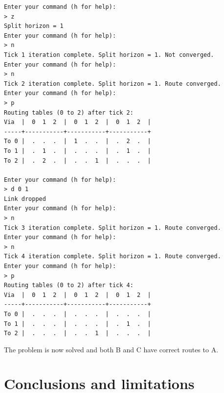 \documentclass[english,11pt]{article}
\newcommand{\ok}{\fontsize{9}{11}\selectfont}
\begin{document}
{\ok
\begin{verbatim}
Enter your command (h for help):                              
> z                                                           
Split horizon = 1                                             
Enter your command (h for help):                              
> n                                                           
Tick 1 iteration complete. Split horizon = 1. Not converged.  
Enter your command (h for help):                              
> n                                                           
Tick 2 iteration complete. Split horizon = 1. Route converged.
Enter your command (h for help):                              
> p                                                           
Routing tables (0 to 2) after tick 2:                         
Via  |  0  1  2  |  0  1  2  |  0  1  2  |                    
-----+-----------+-----------+-----------+                    
To 0 |  .  .  .  |  1  .  .  |  .  2  .  |                    
To 1 |  .  1  .  |  .  .  .  |  .  1  .  |                    
To 2 |  .  2  .  |  .  .  1  |  .  .  .  |                    
                                                              
Enter your command (h for help):                              
> d 0 1                                                       
Link dropped                                                  
Enter your command (h for help):                              
> n                                                           
Tick 3 iteration complete. Split horizon = 1. Route converged.
Enter your command (h for help):                              
> n                                                           
Tick 4 iteration complete. Split horizon = 1. Route converged.
Enter your command (h for help):                              
> p                                                           
Routing tables (0 to 2) after tick 4:                         
Via  |  0  1  2  |  0  1  2  |  0  1  2  |                    
-----+-----------+-----------+-----------+                    
To 0 |  .  .  .  |  .  .  .  |  .  .  .  |                    
To 1 |  .  .  .  |  .  .  .  |  .  1  .  |                    
To 2 |  .  .  .  |  .  .  1  |  .  .  .  |                    
\end{verbatim}
}


The problem is now solved and both B and C have correct routes to A.

\section{Conclusions and limitations}
\end{document}
